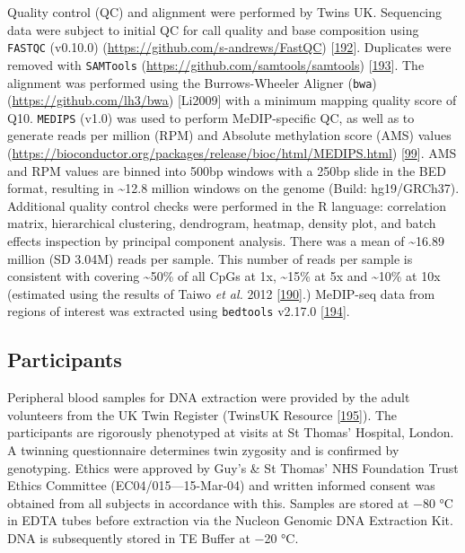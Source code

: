 \documentclass[
]{book}
\begin{document}
Quality control (QC) and alignment were performed by Twins UK.
Sequencing data were subject to initial QC for call quality and base composition using \texttt{FASTQC} (v0.10.0) (\url{https://github.com/s-andrews/FastQC}) {[}\protect\hyperlink{ref-Andrews2010}{192}{]}.
Duplicates were removed with \texttt{SAMTools} (\url{https://github.com/samtools/samtools}) {[}\protect\hyperlink{ref-Li2009b}{193}{]}.
The alignment was performed using the Burrows-Wheeler Aligner (\texttt{bwa}) (\url{https://github.com/lh3/bwa}) {[}Li2009{]} with a minimum mapping quality score of Q10.
\texttt{MEDIPS} (v1.0) was used to perform MeDIP-specific QC, as well as to generate reads per million (RPM) and Absolute methylation score (AMS) values (\url{https://bioconductor.org/packages/release/bioc/html/MEDIPS.html}) {[}\protect\hyperlink{ref-Lienhard2014}{99}{]}.
AMS and RPM values are binned into 500bp windows with a 250bp slide in the BED format, resulting in \textasciitilde12.8 million windows on the genome (Build: hg19/GRCh37).
Additional quality control checks were performed in the R language: correlation matrix, hierarchical clustering, dendrogram, heatmap, density plot, and batch effects inspection by principal component analysis.
There was a mean of \textasciitilde16.89 million (SD 3.04M) reads per sample.
This number of reads per sample is consistent with covering \textasciitilde50\% of all CpGs at 1x, \textasciitilde15\% at 5x and \textasciitilde10\% at 10x (estimated using the results of Taiwo \emph{et al.} 2012 {[}\protect\hyperlink{ref-Taiwo2012}{190}{]}.)
MeDIP-seq data from regions of interest was extracted using \texttt{bedtools} v2.17.0 {[}\protect\hyperlink{ref-Quinlan2010}{194}{]}.

\hypertarget{participants}{%
\subsection{Participants}\label{participants}}

Peripheral blood samples for DNA extraction were provided by the adult volunteers from the UK Twin Register (TwinsUK Resource {[}\protect\hyperlink{ref-Moayyeri2013}{195}{]}).
The participants are rigorously phenotyped at visits at St Thomas' Hospital, London.
A twinning questionnaire determines twin zygosity and is confirmed by genotyping.
Ethics were approved by Guy's \& St Thomas' NHS Foundation Trust Ethics Committee (EC04/015---15-Mar-04) and written informed consent was obtained from all subjects in accordance with this.
Samples are stored at −80 °C in EDTA tubes before extraction via the Nucleon Genomic DNA Extraction Kit.
DNA is subsequently stored in TE Buffer at −20 °C.
\end{document}
